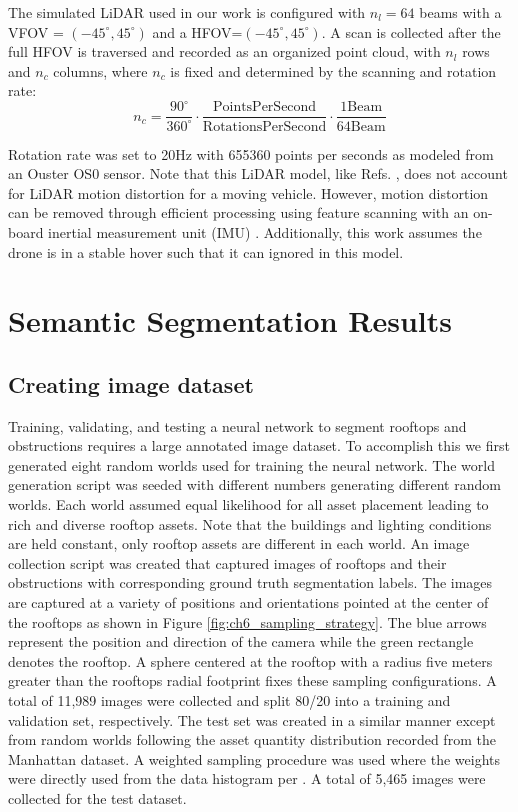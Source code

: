 The simulated LiDAR used in our work is configured with $n_l=64$ beams with a VFOV = $(-45^{\circ}, 45^{\circ})$ and a HFOV=$(-45^{\circ}, 45^{\circ})$. A scan is collected after the full HFOV is traversed and recorded as an organized point cloud, with $n_l$ rows and $n_c$ columns, where  $n_c$ is fixed and determined by the scanning and rotation rate:
$$
n_c = \frac{90^{\circ}}{360^{\circ}} \cdot \frac{\text{PointsPerSecond}}{\text{RotationsPerSecond} } \cdot \frac{1 \text{Beam}}{64 \text{Beam}}
$$

Rotation rate was set to 20Hz with 655360 points per seconds as modeled from an Ouster OS0 sensor\cite{ouster_os0}. Note that this LiDAR model, like Refs. \cite{schaefer_maximum_2019, koenig_design_2004}, does not account for LiDAR motion distortion for a moving vehicle. However, motion distortion can be removed through efficient processing using feature scanning with an on-board inertial measurement unit (IMU) \cite{mohamed_survey_2019, zhang_point_2019}. Additionally, this work assumes the drone is in a stable hover such that it can ignored in this model.

\section{Semantic Segmentation Results}\label{sec:ch6_segmention_results}

\subsection{Creating image dataset}

Training, validating, and testing a neural network to segment rooftops and obstructions requires a large annotated image dataset. To accomplish this we first generated eight random worlds used for training the neural network.  The world generation script was seeded with different numbers generating different random worlds. Each world assumed equal likelihood for all asset placement leading to rich and diverse rooftop assets. Note that the buildings and lighting conditions are held constant, only rooftop assets are different in each world. An image collection script was created that captured images of rooftops and their obstructions with corresponding ground truth segmentation labels.  The images are captured at a variety of positions and orientations pointed at the center of the rooftops as shown in Figure \ref{fig:ch6_sampling_strategy}. The blue arrows represent the position and direction of the camera while the green rectangle denotes the rooftop. A sphere centered at the rooftop with a radius five meters greater than the rooftops radial footprint fixes these sampling configurations. A total of 11,989 images were collected and split 80/20 into a training and validation set, respectively. The test set was created in a similar manner except from random worlds following the asset quantity distribution recorded from the Manhattan dataset.  A weighted sampling procedure was used where the weights were directly used from the data histogram per \cite{Efraimidis2008}. A total of 5,465 images were collected for the test dataset.

